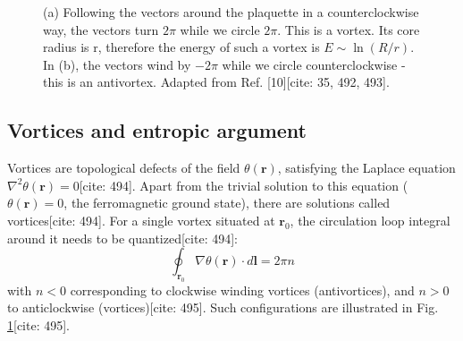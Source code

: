 \documentclass[11pt]{article}
\begin{document}
\begin{figure}[h!]
    \centering
    \caption{(a) Following the vectors around the plaquette in a counterclockwise way, the vectors turn $2\pi$ while we circle $2\pi$. This is a vortex. Its core radius is r, therefore the energy of such a vortex is $E \sim \ln(R/r)$. In (b), the vectors wind by $-2\pi$ while we circle counterclockwise - this is an antivortex. Adapted from Ref. [10][cite: 35, 492, 493].}
    \label{fig:vortex_antivortex}
\end{figure}

\subsection{Vortices and entropic argument}

Vortices are topological defects of the field $\theta(\mathbf{r})$, satisfying the Laplace equation $\nabla^2 \theta(\mathbf{r}) = 0$[cite: 494]. Apart from the trivial solution to this equation ($\theta(\mathbf{r}) = 0$, the ferromagnetic ground state), there are solutions called vortices[cite: 494]. For a single vortex situated at $\mathbf{r}_0$, the circulation loop integral around it needs to be quantized[cite: 494]:
\begin{equation}
\oint_{\mathbf{r}_0} \nabla \theta(\mathbf{r}) \cdot d\mathbf{l} = 2\pi n \label{eq:vortex_quant}
\end{equation}
with $n < 0$ corresponding to clockwise winding vortices (antivortices), and $n > 0$ to anticlockwise (vortices)[cite: 495]. Such configurations are illustrated in Fig. \ref{fig:vortex_antivortex}[cite: 495].
\end{document}
